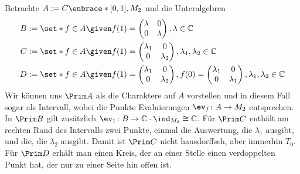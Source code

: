 \begin{beispiel}[{name=[{Wege in $2 \times 2$-Matrizen}]}]
	Betrachte $A := C\enbrace*{[0,1],M_2}$ und die Unteralgebren 
	\begin{align}
		B &:= \set*{f \in A \given f(1) = \begin{pmatrix} \lambda & 0\\ 0 & \lambda \end{pmatrix}, \lambda \in \mathbb{C}}\\
		C &:= \set*{f \in A \given f(1) = \begin{pmatrix} \lambda_1 & 0\\ 0 & \lambda_2 \end{pmatrix}, \lambda_1, \lambda_2 \in \mathbb{C}} \\
		D &:= \set*{f \in A \given f(1)= \begin{pmatrix} \lambda_1 & 0\\ 0 & \lambda_2 \end{pmatrix}, f(0)= \begin{pmatrix} \lambda_1 & 0\\ 0 & \lambda_1 \end{pmatrix}, \lambda_1, \lambda_2 \in \mathbb{C}}
	\end{align}
	Wir können uns $\Prim A$ als die Charaktere auf $A$ vorstellen und in diesem Fall sogar als Intervall, wobei die Punkte Evaluierungen $\ev_f \colon A \to M_2$ entsprechen.
	In $\Prim B$ gilt zusätzlich $\ev_1 \colon B \to \mathbb{C} \cdot \ind_{M_2} \cong \mathbb{C}$.
	Für $\Prim C$ enthält am rechten Rand des Intervalls zwei Punkte, einmal die Auswertung, die $\lambda_1$ ausgibt, und die, die $\lambda_2$ ausgibt.
	Damit ist $\Prim C$ nicht hausdorffsch, aber immerhin $T_0$.
	Für $\Prim D$ erhält man einen Kreis, der an einer Stelle einen verdoppelten Punkt hat, der nur zu einer Seite hin offen ist.
\end{beispiel}

